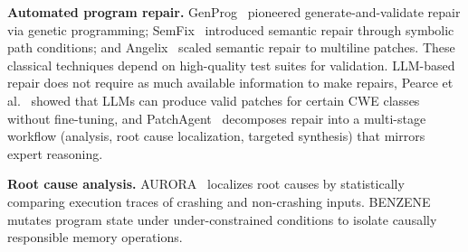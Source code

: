 \medskip
\noindent
\textbf{Automated program repair.}
GenProg~\cite{legoues2012genprog} pioneered generate-and-validate repair via genetic programming; SemFix~\cite{nguyen2013semfix} introduced semantic repair through symbolic path conditions; and Angelix~\cite{mechtaev2016angelix} scaled semantic repair to multiline patches.
These classical techniques depend on high-quality test suites for validation.
LLM-based repair does not require as much available information to make repairs, Pearce et al.~\cite{pearce2023zeroshotvulnrepair} showed that LLMs can produce valid patches for certain CWE classes without fine-tuning, and PatchAgent~\cite{yu2025patchagent} decomposes repair into a multi-stage workflow (analysis, root cause localization, targeted synthesis) that mirrors expert reasoning.

\medskip
\noindent
\textbf{Root cause analysis.}
AURORA~\cite{aurora} localizes root causes by statistically comparing execution traces of crashing and non-crashing inputs.
BENZENE~\cite{benzene} mutates program state under under-constrained conditions to isolate causally responsible memory operations.
